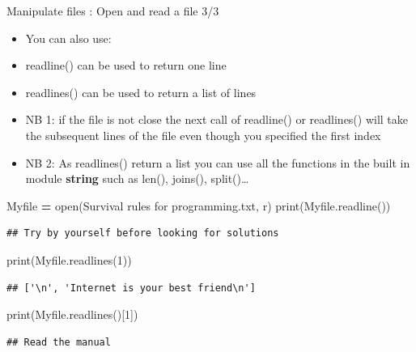 \documentclass[
  8pt,
  ignorenonframetext,
]{beamer}
\newenvironment{Shaded}{\begin{snugshade}}{\end{snugshade}}
\newcommand{\BuiltInTok}[1]{#1}
\newcommand{\DecValTok}[1]{\textcolor[rgb]{0.00,0.00,0.81}{#1}}
\newcommand{\NormalTok}[1]{#1}
\newcommand{\OperatorTok}[1]{\textcolor[rgb]{0.81,0.36,0.00}{\textbf{#1}}}
\newcommand{\StringTok}[1]{\textcolor[rgb]{0.31,0.60,0.02}{#1}}
\begin{document}
\begin{frame}[fragile]{Manipulate files : Open and read a file 3/3}
\protect\hypertarget{manipulate-files-open-and-read-a-file-33}{}
\begin{itemize}
\item
  You can also use:
\item
  readline() can be used to return one line
\item
  readlines() can be used to return a list of lines
\item
  NB 1: if the file is not close the next call of readline() or
  readlines() will take the subsequent lines of the file even though you
  specified the first index
\item
  NB 2: As readlines() return a list you can use all the functions in
  the built in module \textbf{string} such as len(), joins(),
  split()\ldots{}
\end{itemize}

\begin{Shaded}
\begin{Highlighting}[]
\NormalTok{Myfile }\OperatorTok{=} \BuiltInTok{open}\NormalTok{(}\StringTok{\textquotesingle{}Survival rules for programming.txt\textquotesingle{}}\NormalTok{, }\StringTok{\textquotesingle{}r\textquotesingle{}}\NormalTok{)}
\BuiltInTok{print}\NormalTok{(Myfile.readline())}
\end{Highlighting}
\end{Shaded}

\begin{verbatim}
## Try by yourself before looking for solutions
\end{verbatim}

\begin{Shaded}
\begin{Highlighting}[]
\BuiltInTok{print}\NormalTok{(Myfile.readlines(}\DecValTok{1}\NormalTok{))}
\end{Highlighting}
\end{Shaded}

\begin{verbatim}
## ['\n', 'Internet is your best friend\n']
\end{verbatim}

\begin{Shaded}
\begin{Highlighting}[]
\BuiltInTok{print}\NormalTok{(Myfile.readlines()[}\DecValTok{1}\NormalTok{])}
\end{Highlighting}
\end{Shaded}

\begin{verbatim}
## Read the manual
\end{verbatim}
\end{frame}
\end{document}
